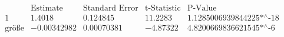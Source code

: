 \[\begin{array}{l|llll}
 \text{} & \text{Estimate} & \text{Standard Error} & \text{t-Statistic} & \text{P-Value} \\
\hline
 1 & 1.4018 & 0.124845 & 11.2283 & \text{1.1285006939844225$\grave{ }$*${}^{\wedge}$-18} \\
 \text{gr{\" o}{\ss}e} & -0.00342982 & 0.00070381 & -4.87322 & \text{4.8200669836621545$\grave{ }$*${}^{\wedge}$-6} \\
\end{array}\]

